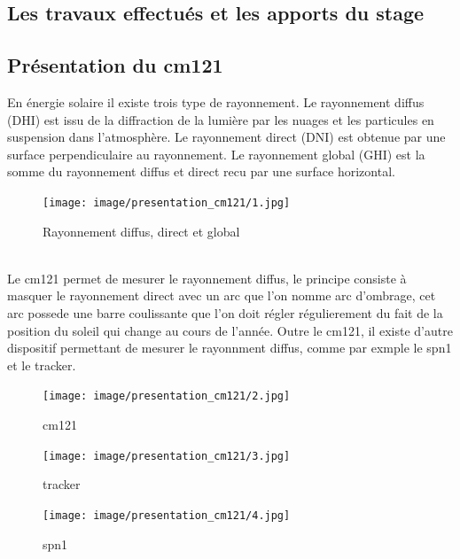 \documentclass[12pt,a4paper]{article}
\begin{document}
\begin{flushleft}
\section{Les travaux effectués et les apports du stage}

\subsection{Présentation du cm121}

En énergie solaire il existe trois type de rayonnement. Le rayonnement diffus (DHI) est issu de la diffraction de la lumière par les nuages et les particules en suspension dans l'atmosphère. Le rayonnement direct (DNI) est obtenue par une surface perpendiculaire au rayonnement. Le rayonnement global (GHI) est la somme du rayonnement diffus et direct recu  par une surface horizontal.\\

\begin{figure}[H]
\centering
\texttt{[image: image/presentation\_cm121/1.jpg]} 
\caption{Rayonnement diffus, direct et global}
\end{figure}

~\\
Le cm121 permet de mesurer le rayonnement diffus, le principe consiste à masquer le rayonnement direct avec un arc que l'on nomme arc d'ombrage, cet arc possede une barre coulissante que l'on doit régler régulierement du fait de la position du soleil qui change au cours de l'année.  Outre le cm121, il existe d'autre dispositif permettant de mesurer le rayonnment diffus, comme par exmple le spn1 et le tracker. 

\begin{figure}[H]
    \begin{minipage}[c]{.2\linewidth}
        \centering
        \texttt{[image: image/presentation\_cm121/2.jpg]}  
        \caption{cm121}
    \end{minipage}
    \hfill%
    \begin{minipage}[c]{.2\linewidth}
        \centering
        \texttt{[image: image/presentation\_cm121/3.jpg]}  
        \caption{tracker}
    \end{minipage}
    \hfill%
    \begin{minipage}[c]{.3\linewidth}
        \centering
        \texttt{[image: image/presentation\_cm121/4.jpg]} 
        \caption{spn1}
    \end{minipage}
\end{figure}



\end{flushleft}
\end{document}
